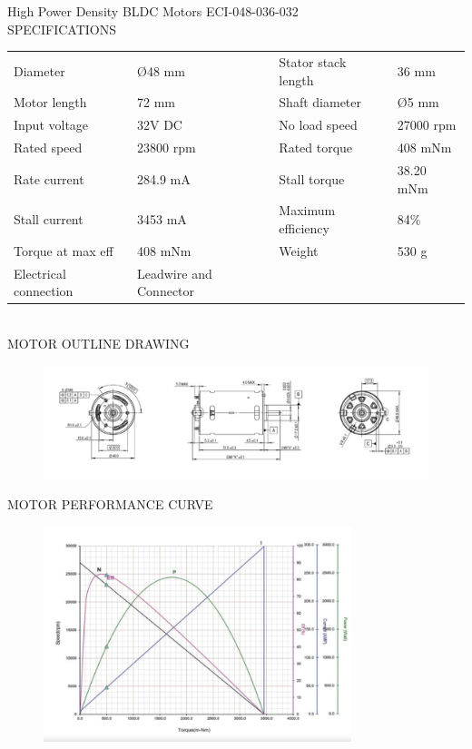 


 

\begin{center}
    \LARGE
    High Power Density BLDC Motors ECI-048-036-032
    \vspace{15mm}\\
    \large
    SPECIFICATIONS
\end{center}
\begin{center}
    
    \begin{tabular}{ll|ll}
        Diameter & Ø48 mm &
        Stator stack length & 36 mm\\
        Motor length & 72 mm &
        Shaft diameter & Ø5 mm\\
        Input voltage & 32V DC&
        No load speed & 27000 rpm \\
        Rated speed & 23800 rpm &
        Rated torque & 408 mNm	 \\
        Rate current & 284.9 mA &
        Stall torque & 38.20 mNm \\
        Stall current & 3453 mA &
        Maximum efficiency & 84\% \\
        Torque at max eff & 408 mNm &
        Weight & 530 g\\
        Electrical connection & Leadwire and Connector\\
    \end{tabular}
    \vspace{10mm}\\
    \large
    MOTOR OUTLINE DRAWING
    \begin{figure}[!h]
        \centering
        \includegraphics[width=1\textwidth]{Abbildungen/motor_footprint.png}
        
    \end{figure}

    
    \large
    MOTOR PERFORMANCE CURVE
    \begin{figure}[!h]
        \centering
        \includegraphics[width=0.8\textwidth]{Abbildungen/motorperformance.png}
    \end{figure}
    
\end{center}
 